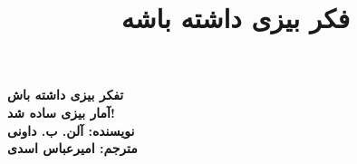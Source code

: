 \documentclass[a4paper,table]{book}
\title{فکر بیزی داشته باشه}
\begin{document}
\makeatletter
    \begin{titlepage}
        \begin{center}
		{\Huge \bfseries  تفکر بیزی داشته باش }\\\vspace{0.5cm}
		{\huge \bfseries  آمار بیزی ساده شد!}\\\vspace{1cm}
		{\Large \bfseries  نویسنده: آلن. ب. داونی }\\\vspace{0.25cm}
            	{\Large \bfseries  مترجم: امیرعباس اسدی }\vspace{0.25cm}
        \end{center}
    \end{titlepage}
\makeatother
\thispagestyle{empty}
\tableofcontents

\end{document}
